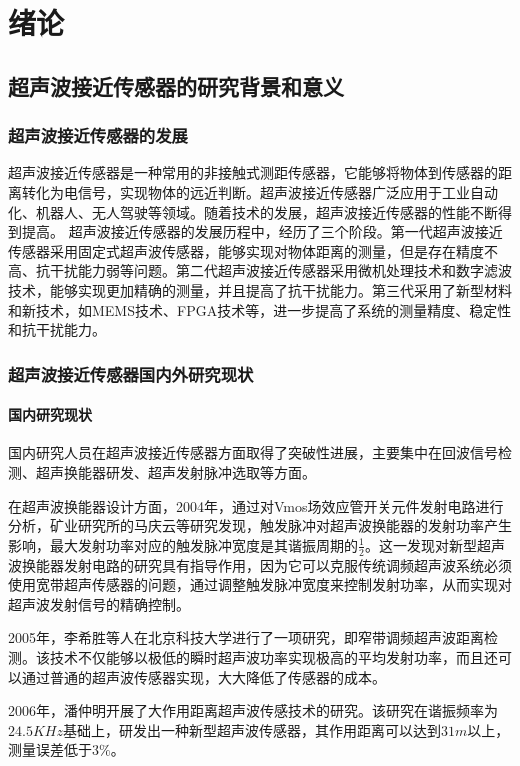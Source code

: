 	\newpage
	\section{绪论}
    \subsection{超声波接近传感器的研究背景和意义}
    \subsubsection{超声波接近传感器的发展}
    超声波接近传感器是一种常用的非接触式测距传感器，它能够将物体到传感器的距离转化为电信号，实现物体的远近判断。超声波接近传感器广泛应用于工业自动化、机器人、无人驾驶等领域。随着技术的发展，超声波接近传感器的性能不断得到提高。    
    超声波接近传感器的发展历程中，经历了三个阶段。第一代超声波接近传感器采用固定式超声波传感器，能够实现对物体距离的测量，但是存在精度不高、抗干扰能力弱等问题。第二代超声波接近传感器采用微机处理技术和数字滤波技术，能够实现更加精确的测量，并且提高了抗干扰能力。第三代采用了新型材料和新技术，如MEMS技术、FPGA技术等，进一步提高了系统的测量精度、稳定性和抗干扰能力。
    \subsubsection{超声波接近传感器国内外研究现状}
    \paragraph{国内研究现状}
	国内研究人员在超声波接近传感器方面取得了突破性进展，主要集中在回波信号检测、超声换能器研发、超声发射脉冲选取等方面。
	
	在超声波换能器设计方面，2004年，通过对Vmos场效应管开关元件发射电路进行分析，矿业研究所的马庆云等研究发现，触发脉冲对超声波换能器的发射功率产生影响，最大发射功率对应的触发脉冲宽度是其谐振周期的$\frac{1}{2}$。这一发现对新型超声波换能器发射电路的研究具有指导作用，因为它可以克服传统调频超声波系统必须使用宽带超声传感器的问题，通过调整触发脉冲宽度来控制发射功率，从而实现对超声波发射信号的精确控制。
	
	2005年，李希胜等人在北京科技大学进行了一项研究，即窄带调频超声波距离检测。该技术不仅能够以极低的瞬时超声波功率实现极高的平均发射功率，而且还可以通过普通的超声波传感器实现，大大降低了传感器的成本。
	
	2006年，潘仲明开展了大作用距离超声波传感技术的研究。该研究在谐振频率为$24.5KHz$基础上，研发出一种新型超声波传感器，其作用距离可以达到$31m$以上，测量误差低于$3\%$。
		
